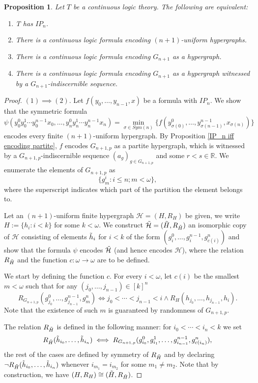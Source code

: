 \documentclass{amsart}
\newtheorem{prop}[teor]{Proposition}
\newtheorem{external claim}[teor]{Claim}
\begin{document}
\begin{prop}\label{IP_n iff coding nonpartite} Let $T$ be a continuous logic theory. The following are equivalent:
\begin{enumerate}
    \item T has $IP_n$.
    \item There is a continuous logic formula encoding $(n+1)$-uniform hypergraphs.
    \item There is a continuous logic formula encoding $G_{n+1}$ as a hypergraph.
    \item There is a continuous logic formula encoding $G_{n+1}$ as a hypergraph witnessed by a $G_{n+1}$-indiscernible sequence.
\end{enumerate}
\end{prop}
    \begin{proof}
            $(1)\implies(2)$. Let $f(y_0,\dots,y_{n-1},x)$ be a formula with $IP_n$. We show that the symmetric formula $$ \psi(y^0_0y^1_0\cdots y^{n-1}_0x_0,\dots,y^0_ny^1_n\cdots y^{n-1}_nx_n)=\min_{\sigma\in Sym(n)} \{ f(y^0_{\sigma(0)},\dots ,y^{n-1}_{\sigma({n-1})},x_{\sigma(n)}) \}$$ encodes every finite $(n+1)$-uniform hypergraph. By Proposition \ref{IP_n iff encoding partite}, $f$ encodes $G_{n+1,p}$ as a partite hypergraph, which is witnessed by a $G_{n+1,p}$-indiscernible sequence $(a_g)_{g\in G_{n+1,p}}$ and some $r<s\in \mathbb{R}$. We enumerate the elements of $G_{n+1,p}$ as $$\{ g^i_m: i\leq n ; m<\omega \},$$ where the superscript indicates which part of the partition the element belongs to.

            Let an $(n+1)$-uniform finite hypergraph $\mathcal{H}=(H,R_H)$ be given, we write $H:=\{ h_i: i<k \}$ for some $k<\omega$. We construct $\Tilde{\mathcal{H}}=(\Tilde{H},R_{\Tilde{H}})$ an isomorphic copy of $\mathcal{H}$ consisting of elements $\Tilde{h}_i$ for $i<k$ of the form $( g^0_i,\dots,g^{n-1}_i,g^{n}_{c(i)} )$ and show that the formula $\psi$ encodes $\Tilde{\mathcal{H}}$ (and hence encodes $\mathcal{H}$), where the relation $R_{\Tilde{H}}$ and the function $c:\omega\to\omega$ are to be defined.

            We start by defining the function $c$. For every $i<\omega$, let $c(i)$  be the smallest $m<\omega$ such that for any $(j_0,\dots,j_{n-1})\in [k]^n$ $$ R_{G_{n+1,p}}(g^0_{j_0},\dots, g^{n-1}_{j_{n-1}}, g^n_m) \iff j_0<\cdots < j_{n-1}<i \wedge R_H(h_{j_0},\dots,h_{j_{n-1}},h_i).$$ Note that the existence of such $m$ is guaranteed by randomness of $G_{n+1,p}$.

            The relation $R_{\Tilde{H}}$ is defined in the following manner: for $i_0<\cdots<i_n<k$ we set $$R_{\Tilde{H}}(\Tilde{h}_{i_0},\dots,\Tilde{h}_{i_n}) \iff R_{G_{n+1,p}}( g^0_{i_0}, g^1_{i_1},\dots,g^{n-1}_{i_{n-1}},g^n_{c(i_n)} ),$$ the rest of the cases are defined by symmetry of $R_{\Tilde{H}}$ and by declaring $\neg R_{\Tilde{H}}(\Tilde{h}_{i_0},\dots,\Tilde{h}_{i_n})$ whenever $i_{m_1}=i_{m_2}$ for some $m_1\neq m_2$. Note that by construction, we have $(H,R_{H})\cong(\Tilde{H},R_{\Tilde{H}})$.


\end{proof}
\end{document}

